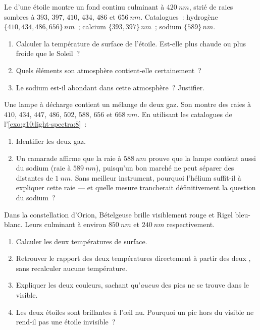 \begin{exercise}[$\star\star\star$]\label{exo:g10:light-spectra:13}
Le  d'une étoile montre un fond continu culminant à
$\qty{420}{nm}$, strié de raies sombres à $393$, $397$, $410$, $434$,
$486$ et $\qty{656}{nm}$. Catalogues~: hydrogène
$\{410, 434, 486, 656\}\,\unit{nm}$~; calcium $\{393, 397\}\,\unit{nm}$~;
sodium $\{589\}\,\unit{nm}$.
\begin{enumerate}
  \item Calculer la température de surface de l'étoile. Est-elle plus
        chaude ou plus froide que le Soleil~?
  \item Quels éléments son atmosphère contient-elle certainement~?
  \item Le sodium est-il abondant dans cette atmosphère~? Justifier.
\end{enumerate}
\end{exercise}

\begin{exercise}[$\star\star\star$]\label{exo:g10:light-spectra:14}
Une lampe à décharge contient un mélange de deux gaz. Son
 montre des raies à $410$, $434$, $447$, $486$, $502$,
$588$, $656$ et $\qty{668}{nm}$. En utilisant les catalogues
de l'\cref{exo:g10:light-spectra:8}~:
\begin{enumerate}
  \item Identifier les deux gaz.
  \item Un camarade affirme que la raie à $\qty{588}{nm}$ prouve que la
        lampe contient aussi du sodium (raie à $\qty{589}{nm}$),
        puisqu'un  bon marché ne peut séparer des
         distantes de $\qty{1}{nm}$. Sans meilleur
        instrument, pourquoi l'hélium suffit-il à expliquer cette raie
        --- et quelle mesure trancherait définitivement la question du
        sodium~?
\end{enumerate}
\end{exercise}

\begin{exercise}[$\star\star\star$]\label{exo:g10:light-spectra:15}
Dans la constellation d'Orion, Bételgeuse brille visiblement rouge et
Rigel bleu-blanc. Leurs  culminant à environ
$\qty{850}{nm}$ et $\qty{240}{nm}$ respectivement.
\begin{enumerate}
  \item Calculer les deux températures de surface.
  \item Retrouver le rapport des deux températures directement à partir
        des deux , sans recalculer aucune
        température.
  \item Expliquer les deux couleurs, sachant qu'\emph{aucun} des pics
        ne se trouve dans le visible.
  \item Les deux étoiles sont brillantes à l'œil nu. Pourquoi un pic
        hors du visible ne rend-il pas une étoile invisible~?
\end{enumerate}
\end{exercise}

